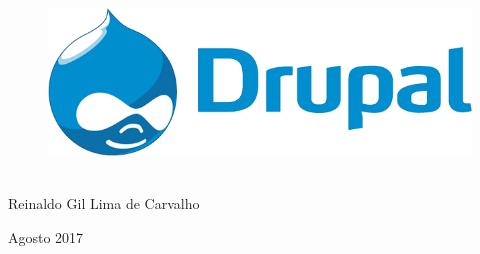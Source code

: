 \thispagestyle{empty}

\begin{center}
  \begin{figure}[H]
    \begin{center}
      \hspace{-1cm}
      \includegraphics[width=0.55\columnwidth]{titlepage}
  ~\cite{FrontPageIMG}
    \end{center}      
  \end{figure}

  \vskip 2cm

  \hspace{-1cm}
  \begin{minipage}[c]{17cm}
    \begin{center}

{\huge {}\vskip 0.15cm %

{\large Reinaldo Gil Lima de Carvalho} %
}
    \end{center}
  \end{minipage}

  \vskip 14cm

  {\huge Agosto 2017} %

\end{center}
